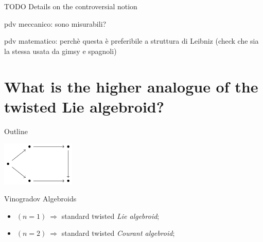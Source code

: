 \documentclass[10pt]{beamer}
\renewcommand{\checkpoint}[0]{
	\setcounter{tocdepth}{1}
	\addtocounter{framenumber}{-1}
 	\begin{frame}[t]{Outline}
  		\tableofcontents[currentsection]
		\begin{center}
			\includegraphics[width=3.5cm]{Pictures/Figure_pentagondiagm_page}
		\end{center}
	\end{frame}
}
\begin{document}
\begin{frame}[fragile]{TODO}
	Details on the controversial notion
	
	pdv meccanico: sono misurabili?
	
	pdv matematico: perchè questa è preferibile a struttura di Leibniz (check che sia la stessa usata da gimsy e spagnoli)
\end{frame}


\section{What is the \textbf{higher analogue} of the \textbf{twisted Lie algebroid}?}
\checkpoint	

\begin{frame}[t]{Vinogradov Algebroids}
	\begin{defblock}
				
	\end{defblock}
	\vfill
	\begin{itemize}
		\item<7-> $(n=1) ~ \Rightarrow$ standard twisted \emph{Lie algebroid};
		\item<8-> $(n=2) ~ \Rightarrow$ standard twisted \emph{Courant algebroid};
	\end{itemize}

\end{frame}
\end{document}
